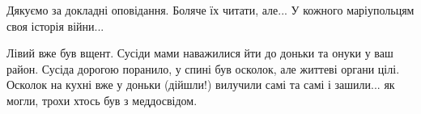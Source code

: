  
 
 
 
 

\qqSecCmt


Дякуємо за докладні оповідання. Боляче їх читати, але... У кожного маріупольцям
своя історія війни...


Лівий вже був вщент. Сусіди мами наважилися йти до доньки та онуки у ваш район.
Сусіда дорогою поранило, у спині був осколок, але життеві органи цілі. Осколок
на кухні вже у доньки (дійшли!) вилучили самі та самі і зашили... як могли,
трохи хтось був з меддосвідом.

